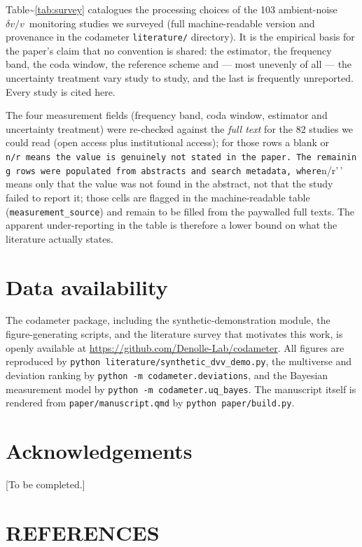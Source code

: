 \documentclass[
  referee]{gji}
\providecommand{\dvv}{\ensuremath{\delta v/v}}
\begin{document}
Table\textasciitilde{}\ref{tab:survey} catalogues the processing choices
of the 103 ambient-noise \dvv~monitoring studies we surveyed (full
machine-readable version and provenance in the codameter
\texttt{literature/} directory). It is the empirical basis for the
paper's claim that no convention is shared: the estimator, the frequency
band, the coda window, the reference scheme and --- most unevenly of all
--- the uncertainty treatment vary study to study, and the last is
frequently unreported. Every study is cited here.

The four measurement fields (frequency band, coda window, estimator and
uncertainty treatment) were re-checked against the \emph{full text} for
the 82 studies we could read (open access plus institutional access);
for those rows a blank or
\texttt{n/r\textquotesingle{}\textquotesingle{}\ means\ the\ value\ is\ genuinely\ not\ stated\ in\ the\ paper.\ The\ remaining\ rows\ were\ populated\ from\ abstracts\ and\ search\ metadata,\ where}n/r'\,'
means only that the value was not found in the abstract, not that the
study failed to report it; those cells are flagged in the
machine-readable table (\texttt{measurement\_source}) and remain to be
filled from the paywalled full texts. The apparent under-reporting in
the table is therefore a lower bound on what the literature actually
states.



\section*{Data availability}\label{data-availability}

The codameter package, including the synthetic-demonstration module, the
figure-generating scripts, and the literature survey that motivates this
work, is openly available at
\url{https://github.com/Denolle-Lab/codameter}. All figures are
reproduced by \texttt{python\ literature/synthetic\_dvv\_demo.py}, the
multiverse and deviation ranking by
\texttt{python\ -m\ codameter.deviations}, and the Bayesian measurement
model by \texttt{python\ -m\ codameter.uq\_bayes}. The manuscript itself
is rendered from \texttt{paper/manuscript.qmd} by
\texttt{python\ paper/build.py}.

\section*{Acknowledgements}\label{acknowledgements}

{[}To be completed.{]}

\section*{REFERENCES}\label{references}

\renewcommand{\bibsection}{}

\end{document}
